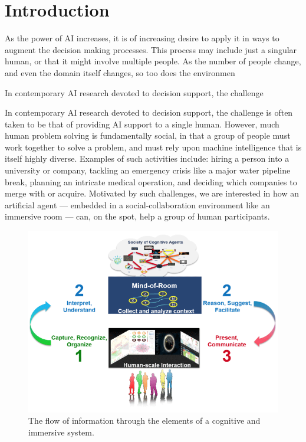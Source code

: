 \section{Introduction}


As the power of AI increases, it is of increasing desire to apply
it in ways to augment the decision making processes. This process
may include just a singular human, or that it might involve
multiple people. As the number of people change, and even the
domain itself changes, so too does the environmen



In contemporary AI research devoted to decision support, the challenge


In contemporary AI research devoted to decision support, the challenge
is often taken to be that of providing AI support to a single human.
However, much human problem solving
is fundamentally social, in that a group of people must work together
to solve a problem, and must rely upon machine intelligence that is
itself highly diverse.  Examples of such activities include: hiring a
person into a university or company, tackling an emergency crisis like
a major water pipeline break, planning an intricate medical operation,
and deciding which companies to merge with or acquire.  Motivated by
such challenges, we are interested in how an artificial agent ---
embedded in a social-collaboration environment like an immersive room
--- can, on the spot, help a group of human participants.

\begin{figure}
\centering
\includegraphics[width=0.5\columnwidth]{chapters/01_introduction/figures/cisl-cycle-graphic.png}
\caption{The flow of information through the elements of a cognitive and immersive system.}
\label{fig:cycle-cais}
\end{figure}

